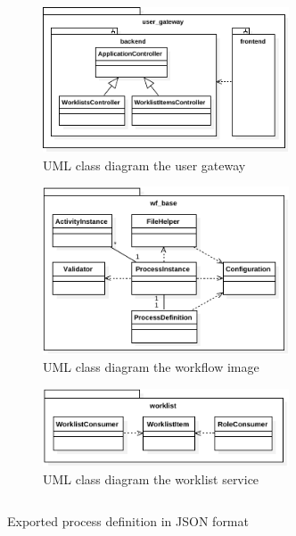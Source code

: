   \begin{figure}[htbp]
    \centering
    \includegraphics[width=0.65\textwidth]{content/images/class_diagram_user_gateway-crop.pdf}
    \caption{UML class diagram the user gateway}
    \label{fig:class_diagram_user_gateway}
  \end{figure}

  \begin{figure}[htbp]
    \centering
    \includegraphics[width=0.65\textwidth]{content/images/class_diagram_wf_base-crop.pdf}
    \caption{UML class diagram the workflow image}
    \label{fig:class_diagram_wf_base}
  \end{figure}

  \begin{figure}[htbp]
    \centering
    \includegraphics[width=0.65\textwidth]{content/images/class_diagram_worklist-crop.pdf}
    \caption{UML class diagram the worklist service}
    \label{fig:class_diagram_worklist}
  \end{figure}

 \clearpage
{}

    \begin{listing}[!h]
      \inputminted[fontsize=\footnotesize,linenos=true,numberblanklines=true,showspaces=false,breaklines=true,baselinestretch=1]{json}{./content/snippets/process_definition.json}
      \caption{Exported process definition in JSON format}
    \label{lst:exported_process_definition_in_json_format}
    \end{listing}

